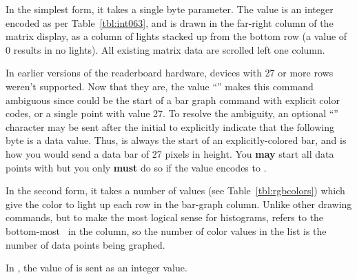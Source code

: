 In the simplest form, it takes a single byte parameter.
The value  is an integer encoded as per Table~\ref{tbl:int063}, and
is drawn in the far-right column of the matrix display, as a column of  lights
stacked up from the bottom row (a value of 0 results in no lights).
All existing matrix data are scrolled left one column.

In earlier versions of the readerboard hardware, devices with 27 or more rows weren't supported. Now that they are,
the value ``'' makes this command ambiguous since  could be the start of a bar graph command with explicit color
codes, or a single point with value 27. To resolve the ambiguity, an optional ``\z{\textasciitilde}'' character may be
sent after the initial  to explicitly indicate that the following byte is a data value. Thus,  is always
the start of an explicitly-colored bar, and  is how you would send a data bar of 27 pixels
in height. You {\bfseries may} start all data points with  but you only {\bfseries must} do so
if the value encodes to .

In the second form, it takes a number of  values (see Table~\ref{tbl:rgbcolors}) which give the color to light up
each row in the bar-graph column. Unlike other drawing commands, but to make the most logical sense for histograms,  refers to the bottom-most
\led\ in the column, so the number of color values in the list is the number of data points being graphed.

In , the value of  is sent as an integer value.

